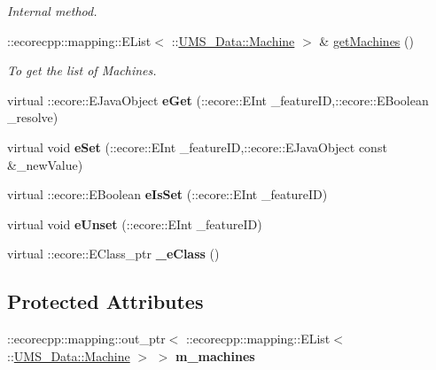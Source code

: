 \begin{DoxyCompactItemize}
\begin{DoxyCompactList}\small\item\em Internal method. \item\end{DoxyCompactList}\item 
::ecorecpp::mapping::EList$<$ ::\hyperlink{classUMS__Data_1_1Machine}{UMS\_\-Data::Machine} $>$ \& \hyperlink{classUMS__Data_1_1ListMachines_a9b95bc9063e46b46784068ac243d95ef}{getMachines} ()
\begin{DoxyCompactList}\small\item\em To get the list of Machines. \item\end{DoxyCompactList}\item 
\hypertarget{classUMS__Data_1_1ListMachines_a1b64800ef82acae44cd65a6d320eae13}{
virtual ::ecore::EJavaObject {\bfseries eGet} (::ecore::EInt \_\-featureID,::ecore::EBoolean \_\-resolve)}
\label{classUMS__Data_1_1ListMachines_a1b64800ef82acae44cd65a6d320eae13}

\item 
\hypertarget{classUMS__Data_1_1ListMachines_a457de78d0cc3b66887d5fe07fcaca513}{
virtual void {\bfseries eSet} (::ecore::EInt \_\-featureID,::ecore::EJavaObject const \&\_\-newValue)}
\label{classUMS__Data_1_1ListMachines_a457de78d0cc3b66887d5fe07fcaca513}

\item 
\hypertarget{classUMS__Data_1_1ListMachines_a443caaff7fc6acef53cef38b531bdf99}{
virtual ::ecore::EBoolean {\bfseries eIsSet} (::ecore::EInt \_\-featureID)}
\label{classUMS__Data_1_1ListMachines_a443caaff7fc6acef53cef38b531bdf99}

\item 
\hypertarget{classUMS__Data_1_1ListMachines_a9ff6806705a4a6a58c664b03cd091cef}{
virtual void {\bfseries eUnset} (::ecore::EInt \_\-featureID)}
\label{classUMS__Data_1_1ListMachines_a9ff6806705a4a6a58c664b03cd091cef}

\item 
\hypertarget{classUMS__Data_1_1ListMachines_a611b28ede012f2769f6cef9ca262faf6}{
virtual ::ecore::EClass\_\-ptr {\bfseries \_\-eClass} ()}
\label{classUMS__Data_1_1ListMachines_a611b28ede012f2769f6cef9ca262faf6}

\end{DoxyCompactItemize}
\subsection*{Protected Attributes}
\begin{DoxyCompactItemize}
\item 
\hypertarget{classUMS__Data_1_1ListMachines_a7ddfb5b0615ea67bc55b8b04811e6bb5}{
::ecorecpp::mapping::out\_\-ptr$<$ ::ecorecpp::mapping::EList$<$ ::\hyperlink{classUMS__Data_1_1Machine}{UMS\_\-Data::Machine} $>$ $>$ {\bfseries m\_\-machines}}
\label{classUMS__Data_1_1ListMachines_a7ddfb5b0615ea67bc55b8b04811e6bb5}

\end{DoxyCompactItemize}


